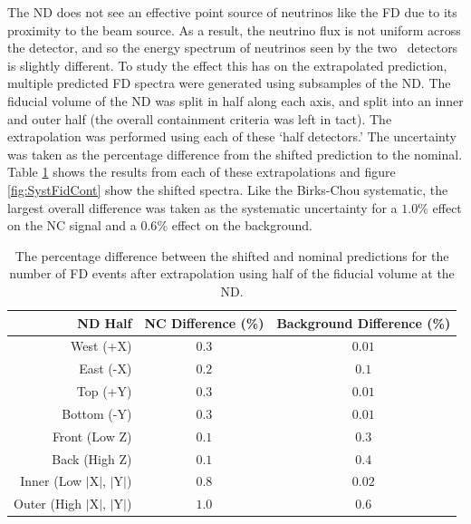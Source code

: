 The ND does not see an effective point source of neutrinos like the FD due to its proximity to the beam source. As a result, the neutrino flux is not uniform across the detector, and so the energy spectrum of neutrinos seen by the two \nova~detectors is slightly different. To study the effect this has on the extrapolated prediction, multiple predicted FD spectra were generated using subsamples of the ND. The fiducial volume of the ND was split in half along each axis, and split into an inner and outer half (the overall containment criteria was left in tact). The extrapolation was performed using each of these `half detectors.' The uncertainty was taken as the percentage difference from the shifted prediction to the nominal. Table \ref{tab:SystFidCont} shows the results from each of these extrapolations and figure \ref{fig:SystFidCont} show the shifted spectra. Like the Birks-Chou systematic, the largest overall difference was taken as the systematic uncertainty for a $1.0\%$ effect on the NC signal and a $0.6\%$ effect on the background.
\begin{table}[htb]
  \begin{center}
    \begin{tabular}{r c c}
      \hline\hline
      ND Half & NC Difference (\%) & Background Difference (\%) \\
      \hline
      West (+X) & $0.3$ & $0.01$ \\
      East (-X) & $0.2$ & $0.1$ \\
      Top (+Y) & $0.3$ & $0.01$ \\
      Bottom (-Y) & $0.3$ & $0.01$ \\
      Front (Low Z) & $0.1$ & $0.3$ \\
      Back (High Z) & $0.1$ & $0.4$ \\
      Inner (Low $\vert$X$\vert$, $\vert$Y$\vert$) & $0.8$ & $0.02$ \\
      Outer (High $\vert$X$\vert$, $\vert$Y$\vert$) & $1.0$ & $0.6$ \\
      \hline
    \end{tabular}
    \caption[ND Containment Systematic Uncertainties]{The percentage difference between the shifted and nominal predictions for the number of FD events after extrapolation using half of the fiducial volume at the ND.}
    \label{tab:SystFidCont}
  \end{center}
\end{table}

